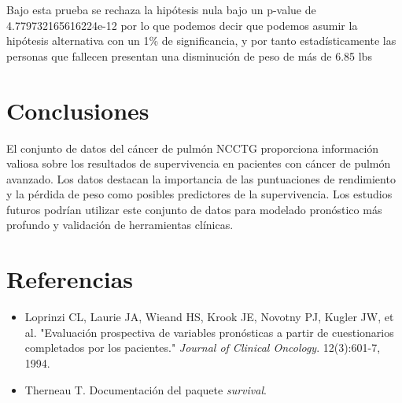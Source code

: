 \documentclass[a4paper,12pt]{article}
\begin{document}
Bajo esta prueba se rechaza la hipótesis nula bajo un p-value de 4.779732165616224e-12 por lo que podemos decir que podemos asumir la hipótesis alternativa con un 1\% de significancia, y por tanto estadísticamente las personas que fallecen presentan una disminución de peso de más de 6.85 lbs

	\section*{Conclusiones}
	El conjunto de datos del cáncer de pulmón NCCTG proporciona información valiosa sobre los resultados de supervivencia en pacientes con cáncer de pulmón avanzado. Los datos destacan la importancia de las puntuaciones de rendimiento y la pérdida de peso como posibles predictores de la supervivencia. Los estudios futuros podrían utilizar este conjunto de datos para modelado pronóstico más profundo y validación de herramientas clínicas.
	
	\section*{Referencias}
	\begin{itemize}
		\item Loprinzi CL, Laurie JA, Wieand HS, Krook JE, Novotny PJ, Kugler JW, et al. "Evaluación prospectiva de variables pronósticas a partir de cuestionarios completados por los pacientes." \textit{Journal of Clinical Oncology}. 12(3):601-7, 1994.
		\item Therneau T. Documentación del paquete \textit{survival}.
	\end{itemize}
	
\end{document}
